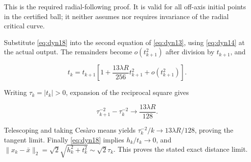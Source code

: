 \documentclass[11pt]{article}
\theoremstyle{remark}\newtheorem{remark}[theorem]{Remark}
\begin{document}
This is the required radial-following proof. It is valid for all off-axis initial points in the certified ball; it neither assumes nor requires invariance of the radial critical curve.

Substitute \eqref{eq:dyn18} into the second equation of \eqref{eq:dyn13}, using \eqref{eq:dyn14} at the actual output. The remainders become \(o(t_{k+1}^2)\) after division by \(t_{k+1}\), and

\begin{equation}
t_k=t_{k+1}\left[1+
\frac{13\lambda R}{256}t_{k+1}^2+o(t_{k+1}^2)\right]. \label{eq:dyn19}
\end{equation}

Writing \(\tau_k=|t_k|>0\), expansion of the reciprocal square gives

\[
\tau_{k+1}^{-2}-\tau_k^{-2}\longrightarrow
\frac{13\lambda R}{128}.
\]

Telescoping and taking Ces\`aro means yields
\(\tau_k^{-2}/k\to13\lambda R/128\), proving the tangent limit. Finally \eqref{eq:dyn18} implies \(h_k/t_k\to0\), and
\(\|x_k-\bar x\|_2=\sqrt2\sqrt{h_k^2+t_k^2}\sim\sqrt2\tau_k\).
This proves the stated exact distance limit.
\end{document}
